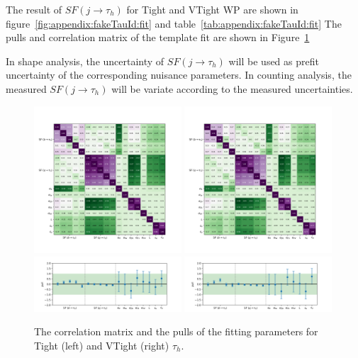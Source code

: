 The result of $SF (j\to \tau_h)$ for Tight and VTight WP are shown in figure~\ref{fig:appendix:fakeTauId:fit} and table~\ref{tab:appendix:fakeTauId:fit}
The pulls and correlation matrix of the template fit are shown in Figure~\ref{fig:appendix:fakeTauId:fitparam}

In shape analysis, the uncertainty of $SF (j \to \tau_h)$ will be used as prefit uncertainty of
the corresponding nuisance parameters.  In counting analysis, 
the measured $SF (j \to
\tau_h)$ will be variate according to the measured uncertainties.




\begin{figure}
    \centering
    \includegraphics[width=0.49\textwidth]{chapters/Appendix/sectionJetToTauh/figures/corr2_lltauTight_splitJetFlavor.png}
    \includegraphics[width=0.49\textwidth]{chapters/Appendix/sectionJetToTauh/figures/corr2_lltauVTight_splitJetFlavor.png}
    \includegraphics[width=0.49\textwidth]{chapters/Appendix/sectionJetToTauh/figures/pull2_lltauTight_splitJetFlavor.png}
    \includegraphics[width=0.49\textwidth]{chapters/Appendix/sectionJetToTauh/figures/pull2_lltauVTight_splitJetFlavor.png}
    \caption{The correlation matrix and the pulls of the fitting parameters for Tight (left) and VTight (right) $\tau_h$. }
    \label{fig:appendix:fakeTauId:fitparam}
\end{figure}



